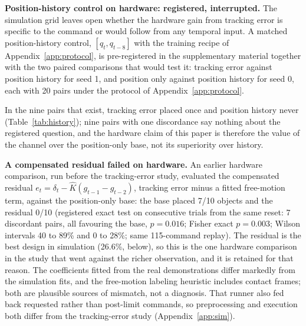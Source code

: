 \documentclass{article}
\begin{document}
\textbf{Position-history control on hardware: registered, interrupted.}
The simulation grid leaves open whether the hardware gain from tracking error
is specific to the command or would follow from any temporal input. A matched
position-history control, $[q_t, q_{t-8}]$ with the training recipe of
Appendix~\ref{app:protocol}, is pre-registered in the supplementary material
together with the two paired comparisons that would test it: tracking error
against position history for seed 1, and position only against position
history for seed 0, each with 20 pairs under the protocol of
Appendix~\ref{app:protocol}.

In the nine pairs that exist, tracking error placed once and position history
never (Table~\ref{tab:history}); nine pairs with one discordance say nothing
about the registered question, and the hardware claim of this paper is
therefore the value of the channel over the position-only base, not its
superiority over history.

\begin{table}[t]
\centering
\small
\caption{Pre-registered position-history comparisons on hardware; A is the
first-named policy. Each evaluation record is shown separately. Errors count
failed process exits, including a logging failure; incomplete comparisons have no test.}
\label{tab:history}
\resizebox{\linewidth}{!}{}
\end{table}

\textbf{A compensated residual failed on hardware.} An earlier hardware
comparison, run before the tracking-error study, evaluated the compensated
residual $e_t=\delta_t-\widehat K(g_{t-1}-g_{t-2})$, tracking error minus a
fitted free-motion term, against the position-only base: the base placed 7/10
objects and the residual 0/10 (registered exact test on consecutive trials
from the same reset: 7 discordant pairs, all favouring the base, $p=0.016$;
Fisher exact $p=0.003$; Wilson intervals 40 to 89\% and 0 to 28\%; same
115-command replay). The residual is the best design in simulation
(26.6\%, below), so this is the one hardware comparison in the study that went
against the richer observation, and it is retained for that reason. The
coefficients fitted from the real demonstrations differ markedly from the
simulation fits, and the free-motion labeling heuristic includes contact
frames; both are plausible sources of mismatch, not a diagnosis. That runner
also fed back requested rather than post-limit commands, so preprocessing and
execution both differ from the tracking-error study
(Appendix~\ref{app:sim}).
\end{document}
